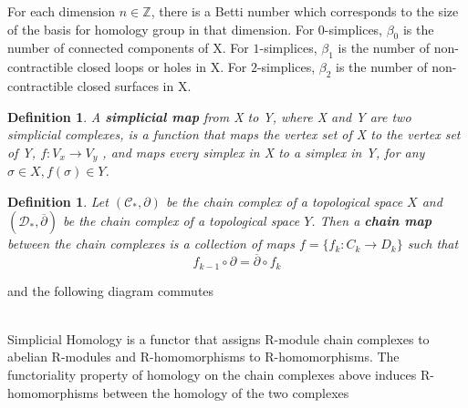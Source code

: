 \documentclass{article}
\newcommand{\be}{\begin{equation}}
\newcommand{\ee}{\end{equation}}
\newtheorem{definition}[theorem]{Definition}
\begin{document}
For each dimension $n \in \mathbb{Z}$, there is a Betti number which corresponds to the size of the basis for homology group in that dimension.  For $0$-simplices, $\beta_0$ is the number of connected components of X. For $1$-simplices, $\beta_1$ is the number of non-contractible closed loops or holes in X. For $2$-simplices, $\beta_2$ is the number of non-contractible closed surfaces in X.
\begin{definition} A \textbf{simplicial map} from X to Y, where X and Y are two simplicial complexes, is a function that maps the vertex set of X to the vertex set of Y, $f: V_x \to V_y$ , and maps every simplex in X to a simplex in Y, for any $\sigma \in X, f(\sigma) \in Y$.
\end{definition}
\begin{definition} Let $(\mathcal{C}_{*}, \partial)$ be the chain complex of a topological space $X$ and $(\mathcal{D}_{*},\overline{\partial})$ be the chain complex of a topological space $Y$. Then a \textbf{chain map} between the chain complexes is a collection of maps $f = \{f_k: C_k \to D_k\}$ such that
\be
f_{k-1}\circ \partial = \overline{\partial}\circ f_{k}
\ee
\end{definition}
and the following diagram commutes\\

\\
Simplicial Homology is a functor that assigns R-module chain complexes to abelian R-modules and R-homomorphisms to R-homomorphisms. The functoriality property of homology on the chain complexes above induces R-homomorphisms between the homology of the two complexes
\end{document}
